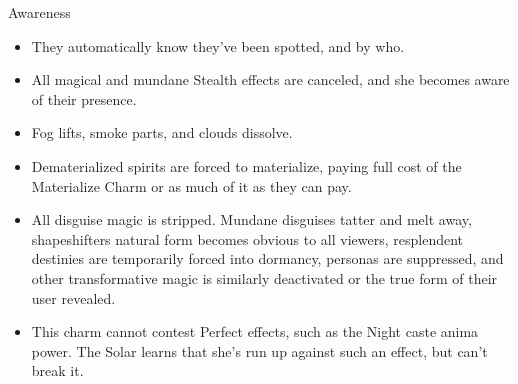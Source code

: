 \begin{Ability}{Awareness}
  \begin{itemize}
    \item They automatically know they've been spotted, and by who.
    \item All magical and mundane Stealth effects are canceled, and she becomes aware of their presence.
    \item Fog lifts, smoke parts, and clouds dissolve.
    \item Dematerialized spirits are forced to materialize, paying full cost of the Materialize Charm or as much of it as they can pay.
    \item All disguise magic is stripped. Mundane disguises tatter and melt away, shapeshifters natural form becomes obvious to all viewers, resplendent destinies are temporarily forced into dormancy, personas are suppressed, and other transformative magic is similarly deactivated or the true form of their user revealed.
    \item This charm cannot contest Perfect effects, such as the Night caste anima power. The Solar learns that she's run up against such an effect, but can't break it.
  \end{itemize}

\end{Ability}

